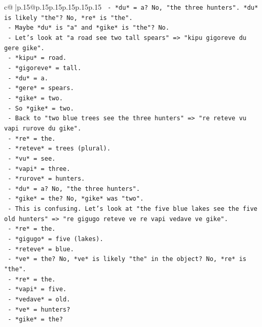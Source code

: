 \documentclass{article}
\begin{document}
{\begin{supertabular}{c@{$\;$}|p{.15\linewidth}@{}p{.15\linewidth}p{.15\linewidth}p{.15\linewidth}p{.15\linewidth}p{.15\linewidth}}
{{{\texttt{        {-} *du* = a? No, "the three hunters". *du* is likely "the"? No, *re* is "the".} \\
\texttt{        {-} Maybe *du* is "a" and *gike* is "the"? No.} \\
\texttt{        {-} Let's look at "a road see two tall spears" => "kipu gigoreve du gere gike".} \\
\texttt{          {-} *kipu* = road.} \\
\texttt{          {-} *gigoreve* = tall.} \\
\texttt{          {-} *du* = a.} \\
\texttt{          {-} *gere* = spears.} \\
\texttt{          {-} *gike* = two.} \\
\texttt{        {-} So *gike* = two.} \\
\texttt{        {-} Back to "two blue trees see the three hunters" => "re reteve vu vapi rurove du gike".} \\
\texttt{          {-} *re* = the.} \\
\texttt{          {-} *reteve* = trees (plural).} \\
\texttt{          {-} *vu* = see.} \\
\texttt{          {-} *vapi* = three.} \\
\texttt{          {-} *rurove* = hunters.} \\
\texttt{          {-} *du* = a? No, "the three hunters".} \\
\texttt{          {-} *gike* = the? No, *gike* was "two".} \\
\texttt{          {-} This is confusing. Let's look at "the five blue lakes see the five old hunters" => "re gigugo reteve ve re vapi vedave ve gike".} \\
\texttt{            {-} *re* = the.} \\
\texttt{            {-} *gigugo* = five (lakes).} \\
\texttt{            {-} *reteve* = blue.} \\
\texttt{            {-} *ve* = the? No, *ve* is likely "the" in the object? No, *re* is "the".} \\
\texttt{            {-} *re* = the.} \\
\texttt{            {-} *vapi* = five.} \\
\texttt{            {-} *vedave* = old.} \\
\texttt{            {-} *ve* = hunters?} \\
\texttt{            {-} *gike* = the?} \\
}}}
\end{supertabular}}
\end{document}
